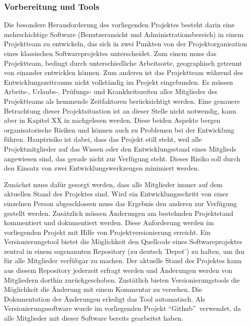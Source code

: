 \subsubsection{Vorbereitung und Tools}
\label{sec:VorbereitungUndTools}

Die besondere Herausforderung des vorliegenden Projektes besteht darin eine mehrschichtige Software (Benutzeransicht und Administrationsbereich) in einem Projektteam zu entwickeln, das sich in zwei Punkten von der Projektorganisation eines klassischen Softwareprojektes unterscheidet. Zum einem muss das Projektteam, bedingt durch unterschiedliche Arbeitsorte, geographisch getrennt von einander entwicklen können. Zum anderen ist das Projektteam während des Entwicklungszeitraums nicht vollständig im Projekt eingebunden. Es müssen Arbeits-, Urlaubs-, Prüfungs- und Krankheitszeiten aller Mitglieder des Projektteams als hemmende Zeitfaktoren berücksichtigt werden. Eine genauere Betrachtung dieser Projektsituation ist an dieser Stelle nicht notwendig, kann aber in Kapitel XX in \citet{unternehmensfuehrung2014} nachgelesen werden.
Diese beiden Aspekte bergen organisatorische Risiken und können auch zu Problemen bei der Entwicklung führen. Hauptrisiko ist dabei, dass das Projekt still steht, weil alle Projektmitglieder auf das Wissen oder den Entwicklungsstand eines Mitglieds angewiesen sind, das gerade nicht zur Verfügung steht. Dieses Risiko soll durch den Einsatz von zwei Entwicklungswerkzeugen minimiert werden.

Zunächst muss dafür gesorgt werden, dass alle Mitglieder immer auf dem aktuellen Stand des Projektes sind. Wird ein Entwicklungsschritt von einer einzelnen Person abgeschlossen muss das Ergebnis den anderen zur Verfügung gestellt werden. Zusätzlich müssen Änderungen am bestehnden Projektstand kommentiert und dokumentiert werden. Diese Anforderung werden im vorliegenden Projekt mit Hilfe von Projektversionierung erreicht. Ein Versionierungstool bietet die Möglichkeit den Quellcode eines Softwareprojektes zentral in einem sogenannten Repository (zu deutsch 'Depot') zu halten, um ihn für alle Mitglieder verfübgar zu machen. Der aktuelle Stand des Projektes kann aus diesem Repository jederzeit erfragt werden und Änderungen werden von Mitgliedern dorthin zurückgeschoben. Zustätlich bieten Versionierungstools die Möglichkeit die Änderung mit einem Kommentar zu versehen. Die Dokumentation der Änderungen erledigt das Tool automatisch. Als Versionierungssoftware wurde im vorliegenden Projekt "`Github"'\footnotemark\ verwendet, da alle Mitglieder mit dieser Software bereits gearbeitet haben.

